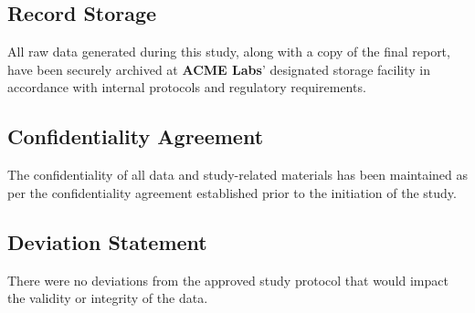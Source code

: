 \documentclass[
  12pt,
]{article}
\begin{document}
\subsection{Record Storage}\label{record-storage}

All raw data generated during this study, along with a copy of the final
report, have been securely archived at \textbf{ACME Labs}' designated
storage facility in accordance with internal protocols and regulatory
requirements.

\subsection{Confidentiality Agreement}\label{confidentiality-agreement}

The confidentiality of all data and study-related materials has been
maintained as per the confidentiality agreement established prior to the
initiation of the study.

\subsection{Deviation Statement}\label{deviation-statement}

There were no deviations from the approved study protocol that would
impact the validity or integrity of the data.
\end{document}
